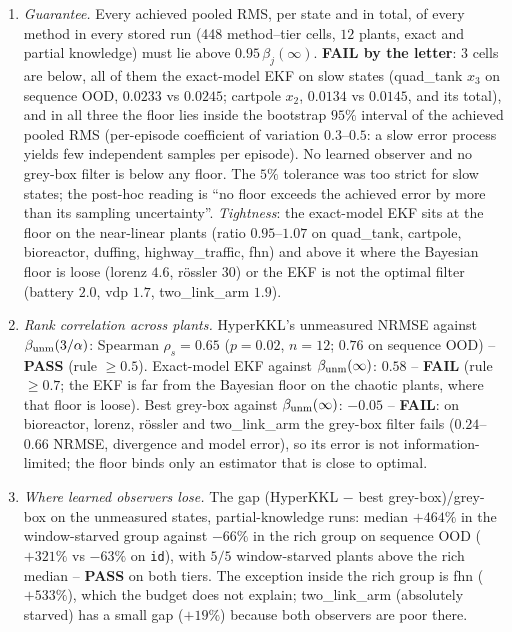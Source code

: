 \begin{enumerate}
\item[(P0)] \emph{Guarantee.} Every achieved pooled RMS, per state and in total, of every method in every stored
run (448 method--tier cells, $12$ plants, exact and partial knowledge) must lie above $0.95\,\beta_j(\infty)$.
\textbf{FAIL by the letter}: $3$ cells are below, all of them the exact-model EKF on slow states (quad\_tank $x_3$
on sequence OOD, $0.0233$ vs $0.0245$; cartpole $x_2$, $0.0134$ vs $0.0145$, and its total), and in all three the
floor lies inside the bootstrap $95\%$ interval of the achieved pooled RMS (per-episode coefficient of variation
$0.3$--$0.5$: a slow error process yields few independent samples per episode). No learned observer and no
grey-box filter is below any floor. The $5\%$ tolerance was too strict for slow states; the post-hoc reading is
``no floor exceeds the achieved error by more than its sampling uncertainty''.
\emph{Tightness}: the exact-model EKF sits at the floor on the near-linear plants (ratio $0.95$--$1.07$ on
quad\_tank, cartpole, bioreactor, duffing, highway\_traffic, fhn) and above it where the Bayesian floor is loose
(lorenz $4.6$, r\"ossler $30$) or the EKF is not the optimal filter (battery $2.0$, vdp $1.7$, two\_link\_arm $1.9$).
\item[(P1)] \emph{Rank correlation across plants.} HyperKKL's unmeasured NRMSE against $\beta_{\rm unm}(3/\alpha)$:
Spearman $\rho_s=0.65$ ($p=0.02$, $n=12$; $0.76$ on sequence OOD) -- \textbf{PASS} (rule $\ge0.5$). Exact-model EKF
against $\beta_{\rm unm}(\infty)$: $0.58$ -- \textbf{FAIL} (rule $\ge0.7$; the EKF is far from the Bayesian floor on
the chaotic plants, where that floor is loose). Best grey-box against $\beta_{\rm unm}(\infty)$: $-0.05$ --
\textbf{FAIL}: on bioreactor, lorenz, r\"ossler and two\_link\_arm the grey-box filter fails ($0.24$--$0.66$ NRMSE,
divergence and model error), so its error is not information-limited; the floor binds only an estimator that is
close to optimal.
\item[(P2)] \emph{Where learned observers lose.} The gap (HyperKKL $-$ best grey-box)/grey-box on the unmeasured
states, partial-knowledge runs: median $+464\%$ in the window-starved group against $-66\%$ in the rich group on
sequence OOD ($+321\%$ vs $-63\%$ on \texttt{id}), with $5/5$ window-starved plants above the rich median --
\textbf{PASS} on both tiers. The exception inside the rich group is fhn ($+533\%$), which the budget does not
explain; two\_link\_arm (absolutely starved) has a small gap ($+19\%$) because both observers are poor there.

\end{enumerate}
